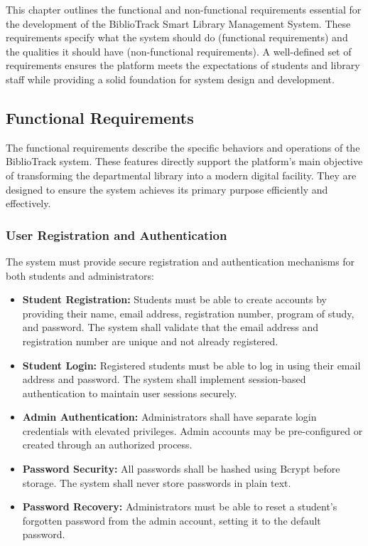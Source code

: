 \documentclass[12pt,a4paper]{report}
\begin{document}
This chapter outlines the functional and non-functional requirements essential for the development of the BiblioTrack Smart Library Management System. These requirements specify what the system should do (functional requirements) and the qualities it should have (non-functional requirements). A well-defined set of requirements ensures the platform meets the expectations of students and library staff while providing a solid foundation for system design and development.

\subsection{Functional Requirements}
\label{subsec:functional}

The functional requirements describe the specific behaviors and operations of the BiblioTrack system. These features directly support the platform's main objective of transforming the departmental library into a modern digital facility. They are designed to ensure the system achieves its primary purpose efficiently and effectively.

\subsubsection{User Registration and Authentication}

The system must provide secure registration and authentication mechanisms for both students and administrators:

\begin{itemize}
    \item \textbf{Student Registration:} Students must be able to create accounts by providing their name, email address, registration number, program of study, and password. The system shall validate that the email address and registration number are unique and not already registered.
    
\newpage    
    
    \item \textbf{Student Login:} Registered students must be able to log in using their email address and password. The system shall implement session-based authentication to maintain user sessions securely.
    
    \item \textbf{Admin Authentication:} Administrators shall have separate login credentials with elevated privileges. Admin accounts may be pre-configured or created through an authorized process.
    
    \item \textbf{Password Security:} All passwords shall be hashed using Bcrypt before storage. The system shall never store passwords in plain text.
    
    \item \textbf{Password Recovery:} Administrators must be able to reset a student’s forgotten password from the admin account, setting it to the default password.
\end{itemize}
\end{document}
